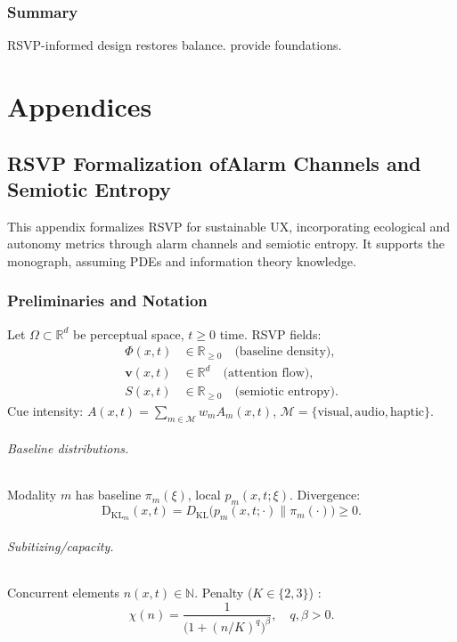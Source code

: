 \documentclass[openany]{book}
\newcommand{\PhiS}{\Phi} %
\newcommand{\vvec}{\mathbf{v}} %
\newcommand{\Sent}{S} %
\newcommand{\KL}{\mathrm{D}_{\mathrm{KL}}}
\begin{document}
{{\section{Summary}
RSVP-informed design restores balance.  provide foundations.

\part{Appendices}

\appendix
\chapter{RSVP Formalization ofAlarm Channels and Semiotic Entropy}
\label{app:rsvp}

This appendix formalizes RSVP for sustainable UX, incorporating ecological and autonomy metrics through alarm channels and semiotic entropy. It supports the monograph, assuming PDEs and information theory knowledge.

\section{Preliminaries and Notation}
\label{sec:rsvp-prelim}
Let \(\Omega \subset \mathbb{R}^d\) be perceptual space, \(t \geq 0\) time. RSVP fields:
\begin{align*}
\PhiS(x,t) &\in \mathbb{R}_{\geq 0} \quad \text{(baseline density)}, \\
\vvec(x,t) &\in \mathbb{R}^d \quad \text{(attention flow)}, \\
\Sent(x,t) &\in \mathbb{R}_{\geq 0} \quad \text{(semiotic entropy)}.
\end{align*}
Cue intensity: \(A(x,t) = \sum_{m \in \mathcal{M}} w_m A_m(x,t)\), \(\mathcal{M} = \{\text{visual}, \text{audio}, \text{haptic}\}\).

\paragraph{Baseline distributions.}
Modality \(m\) has baseline \(\pi_m(\xi)\), local \(p_m(x,t;\xi)\). Divergence:
\begin{equation}
\label{eq:KL}
\KL_{m}(x,t) = D_{\mathrm{KL}}\big(p_m(x,t;\cdot) \|\pi_m(\cdot)\big) \geq 0.
\end{equation}

\paragraph{Subitizing/capacity.}
Concurrent elements \(n(x,t) \in \mathbb{N}\). Penalty (\(K \in \{2,3\}\)) \citep{kaufman1949}:
\begin{equation}
\label{eq:capacity}
\chi(n) = \frac{1}{\big(1 + (n/K)^q\big)^{\beta}}, \quad q, \beta > 0.
\end{equation}

}}
\end{document}
